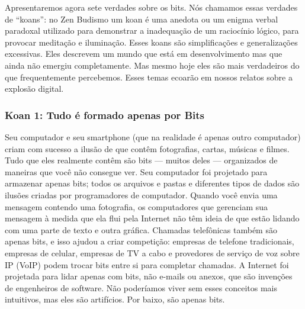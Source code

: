 Apresentaremos agora sete verdades sobre os bits. Nós chamamos essas verdades de
``koans'': no Zen Budismo um koan é uma anedota ou um enigma verbal paradoxal
utilizado para demonstrar a inadequação de um raciocínio lógico, para provocar
meditação e iluminação. Esses koans são simplificações e generalizações
excessivas. Eles descrevem um mundo que está em desenvolvimento mas que ainda
não emergiu completamente. Mas mesmo hoje eles são mais verdadeiros do que
frequentemente percebemos. Esses temas ecoarão em nossos relatos sobre a
explosão digital.


\subsubsection*{Koan 1: Tudo é formado apenas por Bits}
Seu computador e seu smartphone (que na realidade é apenas outro computador)
criam com sucesso a ilusão de que contêm fotografias, cartas, músicas e
filmes. Tudo que eles realmente contêm são bits --- muitos deles --- organizados
de maneiras que você não consegue ver. Seu computador foi projetado para
armazenar apenas bits; todos os arquivos e pastas e diferentes tipos de dados
são ilusões criadas por programadores de computador. Quando você envia uma
mensagem contendo uma fotografia, os computadores que gerenciam sua mensagem à
medida que ela flui pela Internet não têm ideia de que estão lidando com uma
parte de texto e outra gráfica. Chamadas telefônicas também são apenas bits, e
isso ajudou a criar competição: empresas de telefone tradicionais, empresas de
celular, empresas de TV a cabo e provedores de serviço de voz sobre IP (VoIP)
podem trocar bits entre si para completar chamadas. A Internet foi projetada
para lidar apenas com bits, não e-mails ou anexos, que são invenções de
engenheiros de software. Não poderíamos viver sem esses conceitos mais
intuitivos, mas eles são artifícios. Por baixo, são apenas bits.

